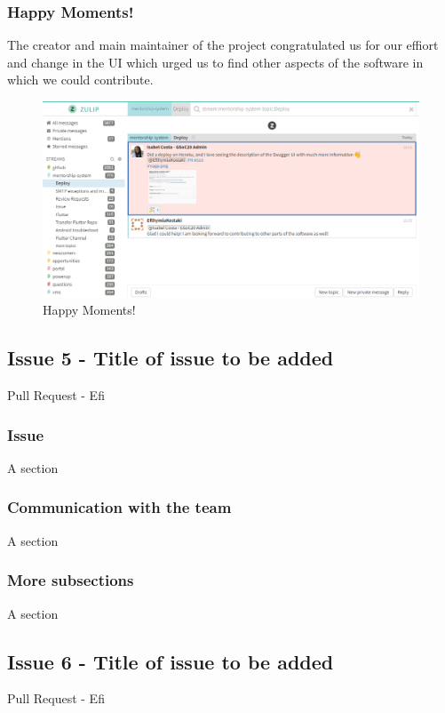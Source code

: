 \documentclass{article}
\begin{document}
\vfill
\clearpage
\subsubsection{Happy Moments!}
The creator and main maintainer of the project congratulated us for our effiort and change in the UI which urged us to find other aspects of the software in which we could contribute.
\begin{figure}[tph!]
\centerline{\includegraphics[totalheight=10cm, width=15cm]{Happy-Moments.png}}
    \caption{Happy Moments!}
    \label{fig:verticalcell}
\end{figure}
\vfill
\clearpage
\subsection{Issue 5 - Title of issue to be added}
Pull Request - Efi

\subsubsection{Issue}
A section

\subsubsection{Communication with the team}
A section

\subsubsection{More subsections}
A section

\subsection{Issue 6 - Title of issue to be added}
Pull Request - Efi
\end{document}
